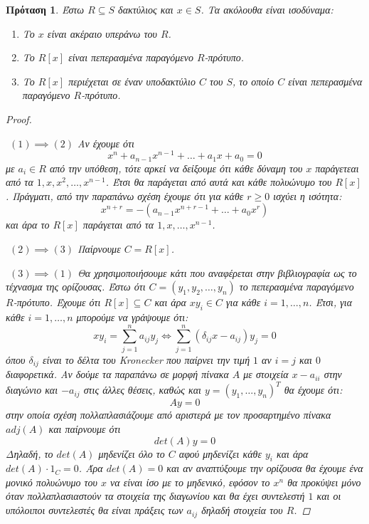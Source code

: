 \documentclass[oneside,a4paper]{article}
\newtheorem{prop}{Πρόταση}
\newcommand {\tl}{\textlatin}
\begin{document}
\begin{prop}
	Έστω $R \subseteq S$ δακτύλιος και $x \in S$. Τα ακόλουθα είναι ισοδύναμα:
	\begin{enumerate}
		\item Το $x$ είναι ακέραιο υπεράνω του $R$.
		\item Το $R[x]$ είναι πεπερασμένα παραγόμενο $R$-πρότυπο.
		\item Το $R[x]$ περιέχεται σε έναν υποδακτύλιο $C$ του $S$, το οποίο $C$ είναι πεπερασμένα παραγόμενο $R$-πρότυπο.  
	\end{enumerate}
	\vspace*{0.1cm}
	\begin{proof} $ $
		
		$ $\newline
		$(1)\implies (2)$ Αν έχουμε ότι $$x^n + a_{n-1} x^{n-1} + \ldots + a_1 x + a_0 = 0$$ με $a_i \in R$ από την υπόθεση, τότε αρκεί να δείξουμε ότι κάθε δύναμη του $x$ παράγετεαι από τα $1,x,x^2,\ldots,x^{n-1}$. Έτσι θα παράγεται από αυτά και κάθε πολυώνυμο του $R[x]$. Πράγματι, από την παραπάνω σχέση έχουμε ότι για κάθε $r\geq 0$ ισχύει η ισότητα: $$x^{n+r} = - \left(a_{n-1}x^{n+r-1} + \ldots + a_0 x^r \right)$$ και άρα το $R[x]$ παράγεται από τα $1,x,\ldots,x^{n-1}$.

		$ $\newline
		$(2) \implies (3)$ Παίρνουμε $C = R[x]$.

		$ $\newline
		$(3) \implies (1)$ Θα χρησιμοποιήσουμε κάτι που αναφέρεται στην βιβλιογραφία ως το τέχνασμα της ορίζουσας. Έστω ότι $C = (y_1,y_2,\ldots,y_n)$ το πεπερασμένα παραγόμενο $R$-πρότυπο. Έχουμε ότι $R[x] \subseteq C$ και άρα $xy_i \in C$ για κάθε $i=1,\ldots,n$. Έτσι, για κάθε $i=1,\ldots,n$ μπορούμε να γράψουμε ότι: $$xy_i = \sum\limits_{j=1}^n a_{ij}y_j \iff 
		\sum\limits_{j=1}^n \left(\delta_{ij}x - a_{ij}\right)y_j = 0$$ όπου $\delta_{ij}$ είναι το δέλτα του \tl{Kronecker} που παίρνει την τιμή $1$ αν $i=j$ και $0$ διαφορετικά. Αν δούμε τα παραπάνω σε μορφή πίνακα $A$ με στοιχεία $x-a_{ii}$ στην διαγώνιο και $-a_{ij}$ στις άλλες θέσεις, καθώς και $y = (y_1,\ldots,y_n)^T$ θα έχουμε ότι:
		$$A y = 0$$ στην οποία σχέση πολλαπλασιάζουμε από αριστερά με τον προσαρτημένο πίνακα $adj(A)$ και παίρνουμε ότι $$det(A) y = 0$$ Δηλαδή, το $det(A)$ μηδενίζει όλο το $C$ αφού μηδενίζει κάθε $y_i$ και άρα $det(A) \cdot 1_C = 0$. Άρα $det(A)=0$ και αν αναπτύξουμε την ορίζουσα θα έχουμε ένα μονικό πολυώνυμο του $x$ να είναι ίσο με το μηδενικό, εφόσον το $x^n$ θα προκύψει μόνο όταν πολλαπλασιαστούν τα στοιχεία της διαγωνίου και θα έχει συντελεστή $1$ και οι υπόλοιποι συντελεστές θα είναι πράξεις των $a_{ij}$ δηλαδή στοιχεία του $R$.
	\end{proof}
\end{prop}
\end{document}

